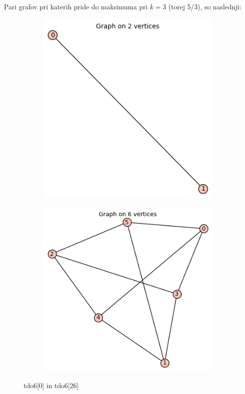 \documentclass[12pt, a4paper]{article}
\begin{document}
Pari grafov pri katerih pride do maksimuma pri $k=3$ (torej 5/3), so naslednji:
\begin{center}
\begin{figure}[!htb]
\centering
\begin{subfigure}{0.5\textwidth}
  \centering
  \includegraphics[width=0.4\linewidth]{tdo6[0]}
\end{subfigure}%
\begin{subfigure}{0.5\textwidth}
  \centering
  \includegraphics[width=0.5\linewidth]{tdo6[26]}
\end{subfigure}
\caption{tdo6[0] in tdo6[26]}
\label{fig:test}
\end{figure}


\end{center}
\end{document}
